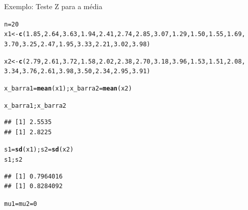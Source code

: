 \documentclass{beamer}\usepackage[]{graphicx}\usepackage[]{color}
\makeatletter
\newcommand{\hlnum}[1]{\textcolor[rgb]{0.686,0.059,0.569}{#1}}%
\newcommand{\hlstd}[1]{\textcolor[rgb]{0.345,0.345,0.345}{#1}}%
\newcommand{\hlkwb}[1]{\textcolor[rgb]{0.69,0.353,0.396}{#1}}%
\newcommand{\hlkwd}[1]{\textcolor[rgb]{0.737,0.353,0.396}{\textbf{#1}}}%
\newenvironment{kframe}{%
 \def\at@end@of@kframe{}%
 \ifinner\ifhmode%
  \def\at@end@of@kframe{\end{minipage}}%
  \begin{minipage}{\columnwidth}%
 \fi\fi%
 \def\FrameCommand##1{\hskip\@totalleftmargin \hskip-\fboxsep
 \colorbox{shadecolor}{##1}\hskip-\fboxsep
     \hskip-\linewidth \hskip-\@totalleftmargin \hskip\columnwidth}%
 \MakeFramed {\advance\hsize-\width
   \@totalleftmargin\z@ \linewidth\hsize
   \@setminipage}}%
 {\par\unskip\endMakeFramed%
 \at@end@of@kframe}
\newenvironment{knitrout}{}{} %
\renewenvironment{knitrout}{\setlength{\topsep}{0mm}}{}
\makeatother
\begin{document}
\begin{frame}[fragile]{Exemplo: Teste Z para a média}

\begin{knitrout}\tiny
{}\color{fgcolor}\begin{kframe}
\begin{alltt}
\hlstd{n}\hlkwb{=}\hlnum{20}
\hlstd{x1} \hlkwb{<-}  \hlkwd{c}\hlstd{(}\hlnum{1.85}\hlstd{,} \hlnum{2.64}\hlstd{,} \hlnum{3.63}\hlstd{,} \hlnum{1.94}\hlstd{,} \hlnum{2.41}\hlstd{,} \hlnum{2.74}\hlstd{,} \hlnum{2.85}\hlstd{,} \hlnum{3.07}\hlstd{,} \hlnum{1.29}\hlstd{,}\hlnum{1.50}\hlstd{,} \hlnum{1.55}\hlstd{,} \hlnum{1.69}\hlstd{,}
         \hlnum{3.70}\hlstd{,} \hlnum{3.25}\hlstd{,} \hlnum{2.47}\hlstd{,} \hlnum{1.95}\hlstd{,} \hlnum{3.33}\hlstd{,} \hlnum{2.21}\hlstd{,} \hlnum{3.02}\hlstd{,} \hlnum{3.98}\hlstd{)}

\hlstd{x2} \hlkwb{<-} \hlkwd{c}\hlstd{(}\hlnum{2.79}\hlstd{,} \hlnum{2.61}\hlstd{,} \hlnum{3.72}\hlstd{,} \hlnum{1.58}\hlstd{,} \hlnum{2.02}\hlstd{,} \hlnum{2.38}\hlstd{,} \hlnum{2.70}\hlstd{,} \hlnum{3.18}\hlstd{,} \hlnum{3.96}\hlstd{,} \hlnum{1.53}\hlstd{,} \hlnum{1.51}\hlstd{,} \hlnum{2.08}\hlstd{,}
        \hlnum{3.34}\hlstd{,} \hlnum{3.76}\hlstd{,} \hlnum{2.61}\hlstd{,} \hlnum{3.98}\hlstd{,} \hlnum{3.50}\hlstd{,} \hlnum{2.34}\hlstd{,} \hlnum{2.95}\hlstd{,} \hlnum{3.91}\hlstd{)}

\hlstd{x_barra1} \hlkwb{=} \hlkwd{mean}\hlstd{(x1); x_barra2} \hlkwb{=} \hlkwd{mean}\hlstd{(x2)}

\hlstd{x_barra1; x_barra2}
\end{alltt}
\begin{verbatim}
## [1] 2.5535
## [1] 2.8225
\end{verbatim}
\begin{alltt}
\hlstd{s1} \hlkwb{=} \hlkwd{sd}\hlstd{(x1); s2}\hlkwb{=}\hlkwd{sd}\hlstd{(x2)}
\hlstd{s1;s2}
\end{alltt}
\begin{verbatim}
## [1] 0.7964016
## [1] 0.8284092
\end{verbatim}
\begin{alltt}
\hlstd{mu1} \hlkwb{=} \hlstd{mu2} \hlkwb{=} \hlnum{0}
\end{alltt}
\end{kframe}
\end{knitrout}
\end{frame} 
\end{document}
